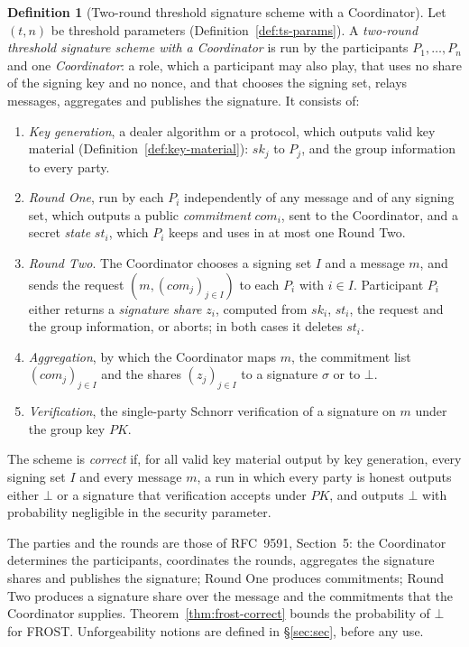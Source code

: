 \documentclass[11pt,a4paper]{article}
\theoremstyle{definition}
\newtheorem{definition}[theorem]{Definition}
\begin{document}
\begin{definition}[Two-round threshold signature scheme with a Coordinator]
\label{def:ts-scheme}
Let \((t, n)\) be threshold parameters (Definition~\ref{def:ts-params}). A
\emph{two-round threshold signature scheme with a Coordinator} is run by
the participants \(P_1, \dots, P_n\) and one \emph{Coordinator}: a role,
which a participant may also play, that uses no share of the signing key
and no nonce, and that chooses the signing set, relays messages, aggregates
and publishes the signature. It consists of:
\begin{enumerate}
\item \emph{Key generation}, a dealer algorithm or a protocol, which outputs
  valid key material (Definition~\ref{def:key-material}): \(\mathit{sk}_j\)
  to \(P_j\), and the group information to every party.
\item \emph{Round One}, run by each \(P_i\) independently of any message and
  of any signing set, which outputs a public \emph{commitment}
  \(\mathit{com}_i\), sent to the Coordinator, and a secret \emph{state}
  \(\mathit{st}_i\), which \(P_i\) keeps and uses in at most one Round Two.
\item \emph{Round Two}. The Coordinator chooses a signing set \(I\) and a
  message \(m\), and sends the request \((m, (\mathit{com}_j)_{j \in I})\)
  to each \(P_i\) with \(i \in I\). Participant \(P_i\) either returns a
  \emph{signature share} \(z_i\), computed from \(\mathit{sk}_i\),
  \(\mathit{st}_i\), the request and the group information, or aborts; in
  both cases it deletes \(\mathit{st}_i\).
\item \emph{Aggregation}, by which the Coordinator maps \(m\), the
  commitment list \((\mathit{com}_j)_{j \in I}\) and the shares
  \((z_j)_{j \in I}\) to a signature \(\sigma\) or to \(\bot\).
\item \emph{Verification}, the single-party Schnorr verification of a
  signature on \(m\) under the group key \(\mathit{PK}\).
\end{enumerate}
The scheme is \emph{correct} if, for all valid key material output by key
generation, every signing set \(I\) and every message \(m\), a run in which
every party is honest outputs either \(\bot\) or a signature that
verification accepts under \(\mathit{PK}\), and outputs \(\bot\) with
probability negligible in the security parameter.
\end{definition}

The parties and the rounds are those of RFC~9591, Section~5: the
Coordinator determines the participants, coordinates the rounds, aggregates
the signature shares and publishes the signature; Round One produces
commitments; Round Two produces a signature share over the message and the
commitments that the Coordinator supplies. Theorem~\ref{thm:frost-correct}
bounds the probability of \(\bot\) for FROST. Unforgeability notions are
defined in \S\ref{sec:sec}, before any use.
\end{document}
